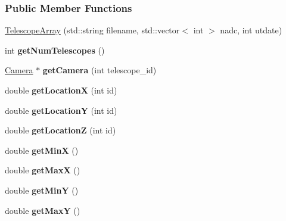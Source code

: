 \subsubsection*{Public Member Functions}
\begin{DoxyCompactItemize}
\item 
\hyperlink{classTelescopeArray_ac1cc84c501daa3f8d5ebbdcff8c3e9f8}{TelescopeArray} (std::string filename, std::vector$<$ int $>$ nadc, int utdate)
\item 
\hypertarget{classTelescopeArray_ae26f422cb0497722bbb64e0fd626f9ef}{
int {\bfseries getNumTelescopes} ()}
\label{classTelescopeArray_ae26f422cb0497722bbb64e0fd626f9ef}

\item 
\hypertarget{classTelescopeArray_aa4d1fdecb99be2eae62a9ffb4290980c}{
\hyperlink{classCamera}{Camera} $\ast$ {\bfseries getCamera} (int telescope\_\-id)}
\label{classTelescopeArray_aa4d1fdecb99be2eae62a9ffb4290980c}

\item 
\hypertarget{classTelescopeArray_a817779b9a1bd4aabb28913b20ea65eb5}{
double {\bfseries getLocationX} (int id)}
\label{classTelescopeArray_a817779b9a1bd4aabb28913b20ea65eb5}

\item 
\hypertarget{classTelescopeArray_ab3b41e51f388a0584ea1265a648195c5}{
double {\bfseries getLocationY} (int id)}
\label{classTelescopeArray_ab3b41e51f388a0584ea1265a648195c5}

\item 
\hypertarget{classTelescopeArray_aa36f218df1cf9e4d363fc98f1e6aa818}{
double {\bfseries getLocationZ} (int id)}
\label{classTelescopeArray_aa36f218df1cf9e4d363fc98f1e6aa818}

\item 
\hypertarget{classTelescopeArray_a7e705ecf29d86116ee696f8b39540a9c}{
double {\bfseries getMinX} ()}
\label{classTelescopeArray_a7e705ecf29d86116ee696f8b39540a9c}

\item 
\hypertarget{classTelescopeArray_a10b7f1b976301ede420843c91e6b98cf}{
double {\bfseries getMaxX} ()}
\label{classTelescopeArray_a10b7f1b976301ede420843c91e6b98cf}

\item 
\hypertarget{classTelescopeArray_aac16d5cc1566bde84d43c870b5e892ba}{
double {\bfseries getMinY} ()}
\label{classTelescopeArray_aac16d5cc1566bde84d43c870b5e892ba}

\item 
\hypertarget{classTelescopeArray_adc205ea5f72b1ac2b2c7ac1eab18f671}{
double {\bfseries getMaxY} ()}
\label{classTelescopeArray_adc205ea5f72b1ac2b2c7ac1eab18f671}

\end{DoxyCompactItemize}


